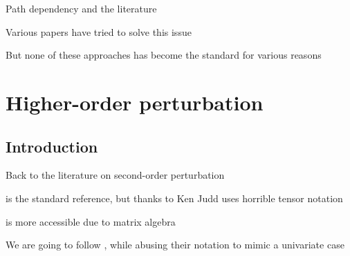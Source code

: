 \begin{frame}{Path dependency and the literature}
  \begin{witemize}
    \item Various papers have tried to solve this issue \parencite[e.g.][]{JuillardKamenik2005,Coeurdacier2011,LanMeyerGohde2013decomposing,LanMeyerGohde2013movingaverage}
    \item But none of these approaches has become the standard for various reasons
  \end{witemize}
\end{frame}



\section{Higher-order perturbation}
\subsection{Introduction}
\renewcommand{\Source}{}
\begin{frame}{Back to the literature on second-order perturbation}
  \begin{witemize}
    \item \textcite{SGU2004} is the standard reference, but thanks to Ken Judd uses horrible tensor notation
    \item \textcite{GommeKlein2011} is more accessible due to \textcite{MagnusNeudecker2007} matrix algebra
    \item We are going to follow \textcite{SGU2004}, while abusing their notation to mimic a univariate case
  \end{witemize}
\end{frame}


